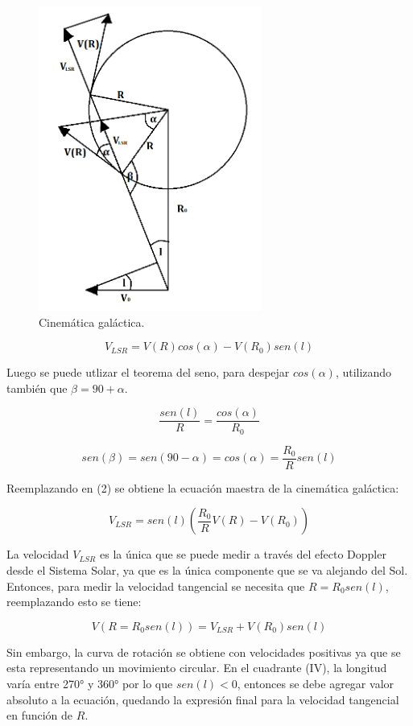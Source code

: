 \documentclass[letterpaper,oneside]{article}
\begin{document}
\begin{figure}
  \centering
  \includegraphics[height=10cm]{../graficos/imagenes/ecuacion_maestra.png}
  \caption{Cinemática galáctica.}
\end{figure}

\begin{equation}
     V_{LSR} = V(R)cos(\alpha) - V(R_0)sen(l) 
\end{equation}

Luego se puede utlizar el teorema del seno, para despejar $cos(\alpha)$, utilizando también que $\beta = 90 + \alpha$.

$$\frac{sen(l)}{R}=\frac{cos(\alpha)}{R_0}$$

$$sen(\beta) = sen(90 - \alpha) = cos(\alpha) = \frac{R_0}{R}sen(l)$$

Reemplazando en (2) se obtiene la ecuación maestra de la cinemática galáctica:

\begin{equation}
    V_{LSR} = sen(l)(\frac{R_0}{R}V(R) - V(R_0))
\end{equation}

La velocidad $V_{LSR}$ es la única que se puede medir a través del efecto Doppler desde el Sistema Solar, ya que es la única componente que se va alejando del Sol. Entonces, para medir la velocidad tangencial se necesita que $R = R_0 sen(l)$, reemplazando esto se tiene:

$$ V(R=R_0 sen(l)) = V_{LSR} + V(R_0)sen(l)  $$

Sin embargo, la curva de rotación se obtiene con velocidades positivas ya que se esta representando un movimiento circular. En el cuadrante (\textrm{IV}), la longitud varía entre 270° y 360° por lo que $sen(l) < 0$, entonces se debe agregar valor absoluto a la ecuación, quedando la expresión final para la velocidad tangencial en función de $R$.
\end{document}
